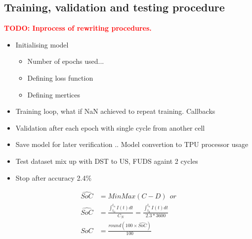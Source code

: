 \subsection{Training, validation and testing procedure}
\textcolor{red}{\textbf{TODO: Inprocess of rewriting procedures.}}
\begin{itemize}
    \item Initialising model \\
    \begin{itemize}
        \item Number of epochs used... \\
        \item Defining loss function \\
        \item Defining mertices \\
    \end{itemize}
    \item Training loop, what if NaN achieved to repeat training. Callbacks
    \item Validation after each epoch with single cycle from another cell \\
    \item Save model for later verification .. Model convertion to TPU processor usage \\
    \item Test dataset mix up with DST to US, FUDS againt 2 cycles
    \item Stop after accuracy 2.4\%
\end{itemize}

\begin{equation}
    \begin{split}
        \hat{SoC} &= MinMax(C-D)\ \ or \\
        \hat{SoC} &= \frac{\int_{t_0}^{t_n} I(t)dt} {C_{N}} = \frac{\int_{t_0}^{t_n} I(t)dt} {2.3*3600} \\
        SoC &= \frac{round(100\times\hat{SoC})}{100}
        \label{eq:SoC-calc}
    \end{split}
\end{equation}
